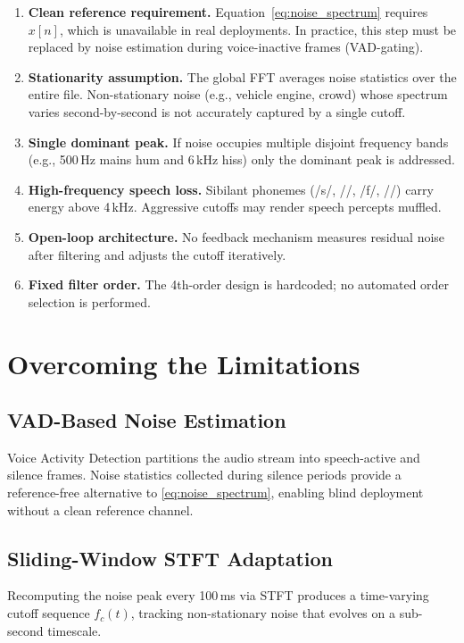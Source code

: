 \documentclass[conference]{IEEEtran}
\begin{document}
\begin{enumerate}
  \item \textbf{Clean reference requirement.} Equation~\eqref{eq:noise_spectrum}
        requires $x[n]$, which is unavailable in real deployments. In
        practice, this step must be replaced by noise estimation during
        voice-inactive frames (VAD-gating).
  \item \textbf{Stationarity assumption.} The global FFT averages noise
        statistics over the entire file. Non-stationary noise (e.g., vehicle
        engine, crowd) whose spectrum varies second-by-second is not
        accurately captured by a single cutoff.
  \item \textbf{Single dominant peak.} If noise occupies multiple disjoint
        frequency bands (e.g., 500\,Hz mains hum and 6\,kHz hiss) only the
        dominant peak is addressed.
  \item \textbf{High-frequency speech loss.} Sibilant phonemes (/s/, /\textesh/,
        /f/, /\theta/) carry energy above 4\,kHz. Aggressive cutoffs may
        render speech percepts muffled.
  \item \textbf{Open-loop architecture.} No feedback mechanism measures
        residual noise after filtering and adjusts the cutoff iteratively.
  \item \textbf{Fixed filter order.} The 4th-order design is hardcoded;
        no automated order selection is performed.
\end{enumerate}

\section{Overcoming the Limitations}
\label{sec:overcoming}

\subsection{VAD-Based Noise Estimation}
Voice Activity Detection partitions the audio stream into speech-active and
silence frames. Noise statistics collected during silence periods provide a
reference-free alternative to \eqref{eq:noise_spectrum}, enabling blind
deployment without a clean reference channel.

\subsection{Sliding-Window STFT Adaptation}
Recomputing the noise peak every 100\,ms via STFT produces a time-varying
cutoff sequence $f_c(t)$, tracking non-stationary noise that evolves on
a sub-second timescale.
\end{document}
